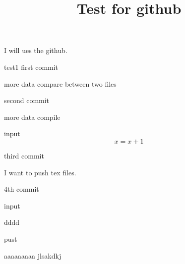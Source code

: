 \documentclass[draft]{amsart}
\title{Test for github}
\theoremstyle{remark}
\begin{document}
\maketitle
I will ues the github.

test1
first commit

more data
compare between two files

second commit

more data
compile

input
\begin{equation*}
    x= x+1
\end{equation*}



third commit

I want to push tex files.


4th commit

input


dddd


pust

aaaaaaaaa
jlsakdkj
\end{document}
